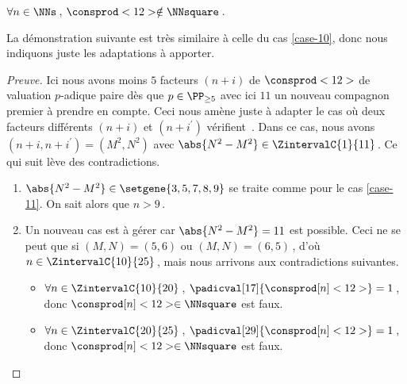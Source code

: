 \begin{fact} \label{case-12}
	 $\forall n \in \NNs$\,, $\consprod<12> \notin \NNsquare$\,.
\end{fact}




La démonstration suivante est très similaire à celle du cas \ref{case-10}, donc nous indiquons juste les adaptations à apporter.


\begin{proof}[Preuve]%
    Ici nous avons moins $5$ facteurs $(n + i)$ de $\consprod<12>$ de valuation $p$-adique paire dès que $p \in \PP_{\geq 5}$ avec ici $11$ un nouveau compagnon premier à prendre en compte.
    Ceci nous amène juste à adapter le cas où deux facteurs différents $(n+i)$ et $(n+i^\prime)$ vérifient \,.
    Dans ce cas, nous avons $(n+i, n+i^\prime) = (M^2, N^2)$ avec $\abs{N^2 - M^2} \in \ZintervalC{1}{11}$\,. Ce qui suit lève des contradictions.
	\begin{enumerate}
		\item $\abs{N^2 - M^2} \in \setgene{3, 5, 7, 8, 9}$ se traite comme pour le cas \ref{case-11}. On sait alors que $n > 9$\,.

			
		\item Un nouveau cas est à gérer car $\abs{N^2 - M^2} = 11$ est possible.
		Ceci ne se peut que si $(M, N) = (5, 6)$ ou $(M, N) = (6, 5)$\,, d'où $n \in \ZintervalC{10}{25}$\,, mais nous arrivons aux contradictions suivantes.
		\begin{itemize}
			\item $\forall n \in \ZintervalC{10}{20}$\,, 
			$\padicval[17]{\consprod[n]<12>} = 1$\,, donc $\consprod[n]<12> \in \NNsquare$ est faux.

			\item $\forall n \in \ZintervalC{20}{25}$\,, 
			$\padicval[29]{\consprod[n]<12>} = 1$\,, donc $\consprod[n]<12> \in \NNsquare$ est faux.
		\qedhere
		\end{itemize}
	\end{enumerate}
\end{proof}


